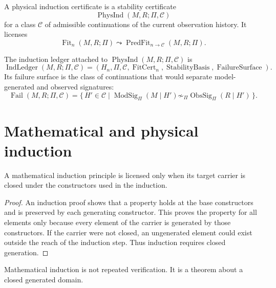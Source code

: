 \begin{definition}
\label{def:physical-induction-certificate-refined}
A physical induction certificate is a stability certificate
$$
\operatorname{PhysInd}(M,R;\Pi,\mathcal C)
$$
for a class $\mathcal C$ of admissible continuations of the current observation history. It licenses
$$
\operatorname{Fit}_n(M,R;\Pi)
\leadsto
\operatorname{PredFit}_{n\to\mathcal C}(M,R;\Pi).
$$
\end{definition}

\begin{definition}
\label{def:induction-ledger-failure-surface}
The induction ledger attached to $\operatorname{PhysInd}(M,R;\Pi,\mathcal C)$ is
$$
\operatorname{IndLedger}(M,R;\Pi,\mathcal C)
=
(H_n,\Pi,\mathcal C,\operatorname{FitCert}_n,
\operatorname{StabilityBasis},
\operatorname{FailureSurface}).
$$
Its failure surface is the class of continuations that would separate model-generated and observed signatures:
$$
\operatorname{Fail}(M,R;\Pi,\mathcal C)
=
\{\,H'\in\mathcal C
\mid
\operatorname{ModSig}_{\Pi}(M\mid H')
\not\sim_{\Pi}
\operatorname{ObsSig}_{\Pi}(R\mid H')\,\}.
$$
\end{definition}

\section{Mathematical and physical induction}
\label{sec:mathematical-physical-induction}

\begin{theorem}
\label{thm:mathematical-induction-requires-closed-carrier}
A mathematical induction principle is licensed only when its target carrier is closed under the constructors used in the induction.
\end{theorem}

\begin{proof}
An induction proof shows that a property holds at the base constructors and is preserved by each generating constructor. This proves the property for all elements only because every element of the carrier is generated by those constructors. If the carrier were not closed, an ungenerated element could exist outside the reach of the induction step. Thus induction requires closed generation.
\end{proof}

\begin{corollary}
\label{cor:induction-is-closure-theorem}
Mathematical induction is not repeated verification. It is a theorem about a closed generated domain.
\end{corollary}


